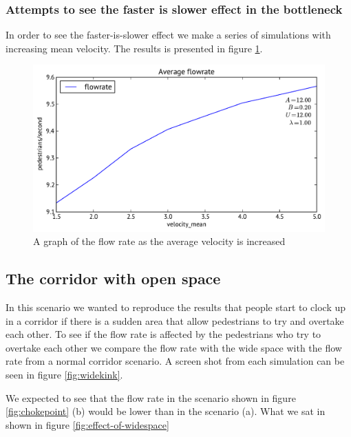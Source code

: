 \subsubsection{Attempts to see the faster is slower effect in the bottleneck}
In order to see the faster-is-slower effect we make a series of simulations 
with increasing mean velocity. The results is presented in figure 
\ref{fig:is-faster-slower-in-bottleneck}.

\begin{figure}[h]
\centering
\includegraphics[scale=0.45]{Figures/Wide-kink-one-directional-flowrate-agg.pdf}
\caption{A graph of the flow rate as the average velocity is increased}
\label{fig:is-faster-slower-in-bottleneck}
\end{figure}

\subsection{The corridor with open space}
In this scenario we wanted to reproduce the results that people start to 
clock up in a corridor if there is a sudden area that allow pedestrians to try 
and overtake each other. To see if the flow rate is affected by the pedestrians 
who try to overtake each other we compare the flow rate with the wide space with 
the flow rate from a normal corridor scenario. A screen shot from each simulation 
can be seen in figure \ref{fig:widekink}.

We expected to see that the flow rate in the scenario shown in figure 
\ref{fig:chokepoint} (b) would be lower than in the scenario (a). What we sat 
in shown in figure \ref{fig:effect-of-widespace}

